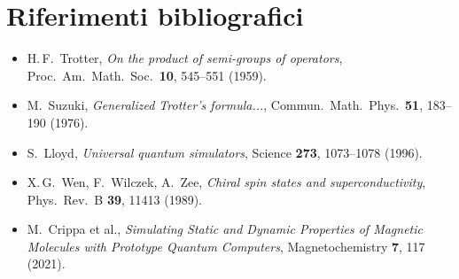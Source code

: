 \documentclass[11pt,a4paper]{article}
\begin{document}
\section*{Riferimenti bibliografici}

\begin{itemize}
\item H.\,F.\ Trotter, \emph{On the product of semi-groups of operators}, Proc.\ Am.\ Math.\ Soc.\ \textbf{10}, 545--551 (1959).
\item M.\ Suzuki, \emph{Generalized Trotter's formula...}, Commun.\ Math.\ Phys.\ \textbf{51}, 183--190 (1976).
\item S.\ Lloyd, \emph{Universal quantum simulators}, Science \textbf{273}, 1073--1078 (1996).
\item X.\,G.\ Wen, F.\ Wilczek, A.\ Zee, \emph{Chiral spin states and superconductivity}, Phys.\ Rev.\ B \textbf{39}, 11413 (1989).
\item M.\ Crippa et al., \emph{Simulating Static and Dynamic Properties of Magnetic Molecules with Prototype Quantum Computers}, Magnetochemistry \textbf{7}, 117 (2021).
\end{itemize}
\end{document}

